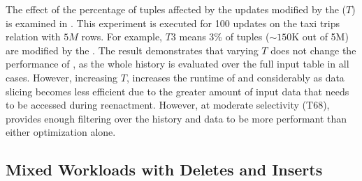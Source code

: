 \label{sec:exp-ds}
The effect of the percentage of  tuples affected by the updates modified by the \abbrHW ($T$) is examined in . This experiment is executed for 100 updates on the taxi trips relation with $5M$ rows. For example, $T3$ means 3\% of tuples ($\sim150$K out of 5M) are modified by the \abbrHW. The result demonstrates that varying $T$ does not change the performance of \mrp, as the whole history is evaluated over the full input table in all cases. However, increasing $T$, increases the runtime of \mrd and \mrdp considerably as data slicing becomes less efficient due to the greater amount of input data that needs to be accessed during reenactment. However, at moderate selectivity (T68), \mrdp provides enough filtering over the history and data to be more performant than either optimization alone. 

\subsection{Mixed Workloads with Deletes and Inserts}\label{sec:mixed-workl-updat}


